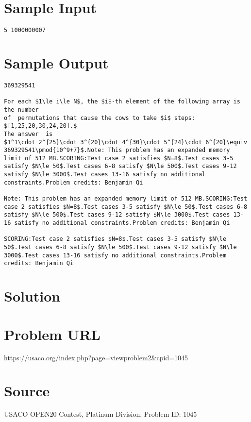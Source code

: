 \documentclass[12pt]{article}
\begin{document}
\section*{Sample Input}
\begin{verbatim}
5 1000000007
\end{verbatim}

\section*{Sample Output}
\begin{verbatim}
369329541

For each $1\le i\le N$, the $i$-th element of the following array is the number
of  permutations that cause the cows to take $i$ steps: $[1,25,20,30,24,20].$
The answer  is
$1^1\cdot 2^{25}\cdot 3^{20}\cdot 4^{30}\cdot 5^{24}\cdot 6^{20}\equiv 369329541\pmod{10^9+7}$.Note: This problem has an expanded memory limit of 512 MB.SCORING:Test case 2 satisfies $N=8$.Test cases 3-5 satisfy $N\le 50$.Test cases 6-8 satisfy $N\le 500$.Test cases 9-12 satisfy $N\le 3000$.Test cases 13-16 satisfy no additional constraints.Problem credits: Benjamin Qi

Note: This problem has an expanded memory limit of 512 MB.SCORING:Test case 2 satisfies $N=8$.Test cases 3-5 satisfy $N\le 50$.Test cases 6-8 satisfy $N\le 500$.Test cases 9-12 satisfy $N\le 3000$.Test cases 13-16 satisfy no additional constraints.Problem credits: Benjamin Qi

SCORING:Test case 2 satisfies $N=8$.Test cases 3-5 satisfy $N\le 50$.Test cases 6-8 satisfy $N\le 500$.Test cases 9-12 satisfy $N\le 3000$.Test cases 13-16 satisfy no additional constraints.Problem credits: Benjamin Qi
\end{verbatim}

\section*{Solution}


\section*{Problem URL}
https://usaco.org/index.php?page=viewproblem2&cpid=1045

\section*{Source}
USACO OPEN20 Contest, Platinum Division, Problem ID: 1045
\end{document}

